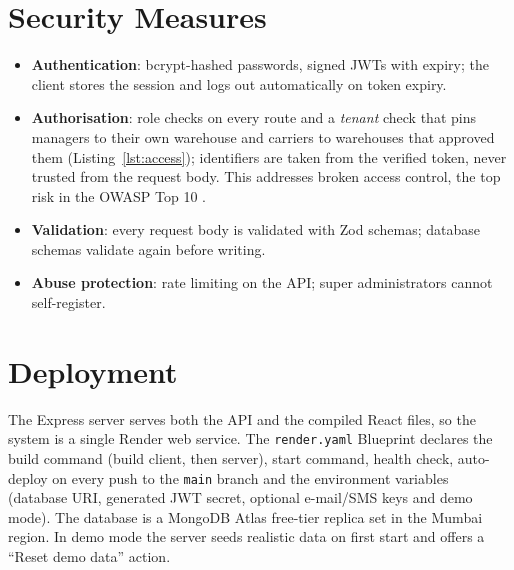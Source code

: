 \section{Security Measures}
\begin{itemize}
  \item \textbf{Authentication}: bcrypt-hashed passwords, signed JWTs with expiry; the client stores the session and logs out automatically on token expiry.
  \item \textbf{Authorisation}: role checks on every route and a \emph{tenant} check that pins managers to their own warehouse and carriers to warehouses that approved them (Listing~\ref{lst:access}); identifiers are taken from the verified token, never trusted from the request body. This addresses broken access control, the top risk in the OWASP Top 10 \cite{owasp2021}.
  \item \textbf{Validation}: every request body is validated with Zod schemas; database schemas validate again before writing.
  \item \textbf{Abuse protection}: rate limiting on the API; super administrators cannot self-register.
\end{itemize}

\section{Deployment}
The Express server serves both the API and the compiled React files, so the system is a single Render web service. The \texttt{render.yaml} Blueprint declares the build command (build client, then server), start command, health check, auto-deploy on every push to the \texttt{main} branch and the environment variables (database URI, generated JWT secret, optional e-mail/SMS keys and demo mode). The database is a MongoDB Atlas free-tier replica set in the Mumbai region. In demo mode the server seeds realistic data on first start and offers a ``Reset demo data'' action.
